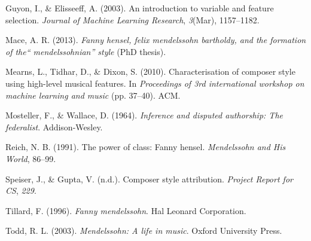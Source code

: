 \documentclass[12pt,twoside]{reedthesis}
\theoremstyle{definition}
\theoremstyle{definition}
\theoremstyle{definition}
\theoremstyle{remark}
\begin{document}
\hypertarget{ref-guyon2003}{}
Guyon, I., \& Elisseeff, A. (2003). An introduction to variable and
feature selection. \emph{Journal of Machine Learning Research},
\emph{3}(Mar), 1157--1182.

\hypertarget{ref-mace2013}{}
Mace, A. R. (2013). \emph{Fanny hensel, felix mendelssohn bartholdy, and
the formation of the`` mendelssohnian'' style} (PhD thesis).

\hypertarget{ref-mearns2010}{}
Mearns, L., Tidhar, D., \& Dixon, S. (2010). Characterisation of
composer style using high-level musical features. In \emph{Proceedings
of 3rd international workshop on machine learning and music} (pp.
37--40). ACM.

\hypertarget{ref-mosteller1964inference}{}
Mosteller, F., \& Wallace, D. (1964). \emph{Inference and disputed
authorship: The federalist}. Addison-Wesley.

\hypertarget{ref-reich1991}{}
Reich, N. B. (1991). The power of class: Fanny hensel. \emph{Mendelssohn
and His World}, 86--99.

\hypertarget{ref-CompStyleAttri}{}
Speiser, J., \& Gupta, V. (n.d.). Composer style attribution.
\emph{Project Report for CS}, \emph{229}.

\hypertarget{ref-tillard1996}{}
Tillard, F. (1996). \emph{Fanny mendelssohn}. Hal Leonard Corporation.

\hypertarget{ref-todd2003}{}
Todd, R. L. (2003). \emph{Mendelssohn: A life in music}. Oxford
University Press.


\end{document}
